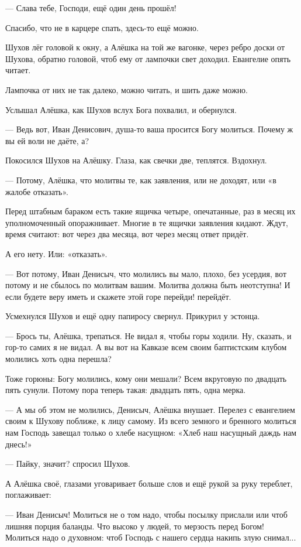 --- Слава тебе, Господи, ещё один день прошёл!

Спасибо, что не в карцере спать, здесь-то ещё можно.

Шухов лёг головой к окну, а Алёшка на той же вагонке, через ребро доски от Шухова, \dash обратно
головой, чтоб ему от лампочки свет доходил. Евангелие опять читает.

Лампочка от них не так далеко, можно читать, и шить даже можно.

Услышал Алёшка, как Шухов вслух Бога похвалил, и обернулся.

--- Ведь вот, Иван Денисович, душа-то ваша просится Богу молиться. Почему ж вы ей воли не даёте,
а?

Покосился Шухов на Алёшку. Глаза, как свечки две, теплятся. Вздохнул.

--- Потому, Алёшка, что молитвы те, как заявления, или не доходят, или «в жалобе отказать».

Перед штабным бараком есть такие ящичка четыре, опечатанные, раз в месяц их уполномоченный
опоражнивает. Многие в те ящички заявления кидают. Ждут, время считают: вот через два месяца,
вот через месяц ответ придёт.

А его нету. Или: «отказать».

--- Вот потому, Иван Денисыч, что молились вы мало, плохо, без усердия, вот потому и не сбылось
по молитвам вашим. Молитва должна быть неотступна! И если будете веру иметь и скажете этой
горе \dash перейди! \dash перейдёт.

Усмехнулся Шухов и ещё одну папиросу свернул. Прикурил у эстонца.

--- Брось ты, Алёшка, трепаться. Не видал я, чтобы горы ходили. Ну, сказать, и гор-то самих я не
видал. А вы вот на Кавказе всем своим баптистским клубом молились \dash хоть одна перешла?

Тоже горюны: Богу молились, кому они мешали? Всем вкруговую по двадцать пять сунули. Потому
пора теперь такая: двадцать пять, одна мерка.

--- А мы об этом не молились, Денисыч, \dash Алёшка внушает. Перелез с евангелием своим к Шухову
поближе, к лицу самому. \Dash Из всего земного и бренного молиться нам Господь завещал только о
хлебе насущном: «Хлеб наш насущный даждь нам днесь!»

--- Пайку, значит? \dash спросил Шухов.

А Алёшка своё, глазами уговаривает больше слов и ещё рукой за руку тереблет, поглаживает:

--- Иван Денисыч! Молиться не о том надо, чтобы посылку прислали или чтоб лишняя порция
баланды. Что высоко у людей, то мерзость перед Богом! Молиться надо о духовном: чтоб Господь с
нашего сердца накипь злую снимал...

